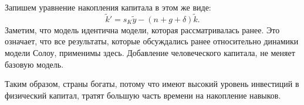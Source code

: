 Запишем уравнение накопления капитала в этом же виде:
\begin{equation*}
\tilde{k}' = s_{K} \tilde{y} - (n + g + \delta) \tilde{k}\text{.}
\end{equation*}
Заметим, что модель идентична модели, которая рассматривалась ранее.
Это означает, что все результаты, которые обсуждались ранее относительно динамики модели Солоу, применимы здесь.
Добавление человеческого капитала, не меняет базовую модель.

Таким образом, страны богаты, потому что имеют высокий уровень инвестиций в физический капитал, тратят большую часть времени на накопление навыков.
